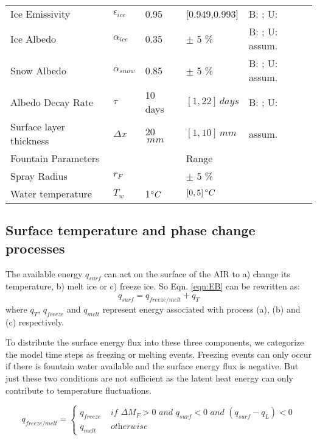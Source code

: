 \documentclass[utf8]{frontiersSCNS} %
\begin{document}
\begin{table}
\begin{tabularx}{\linewidth}{ X l X l X  }
        Ice Emissivity        & $\epsilon_{ice}$ & 0.95 & [0.949,0.993] & B: \citeauthor{CuffeyPaterson_2010}; U:
        \citeauthor{HORI2006486}\\
        Ice Albedo         & $\alpha_{ice}$ & 0.35 & $\pm$ 5 \%  & B: \citeauthor{CuffeyPaterson_2010}; U: assum.   \\
        
        Snow Albedo        & $\alpha_{snow}$ & 0.85 & $\pm$ 5 \% & B: \citeauthor{CuffeyPaterson_2010}; U: assum.  \\
        Albedo Decay Rate & $\tau$ & 10 days & $[1,22]\, days$ & B: \citeauthor{Schmidt_2017}; U:
        \citeauthor{OerlemansKnap_1998}  \\ Surface layer thickness & $\Delta x$ & 20 $\,mm$ & $[1,10]\, mm$   & assum.\\
        \hline Fountain Parameters& & & Range   & \\ \hline 
        Spray Radius & $r_F$ &  & $\pm$ 5 \%   & \\
        Water temperature & $T_w$ & 1$\degree C$ & $[0,5]\, \degree C$   & \\
        \hline \end{tabularx} \label{table:parameters} \end{table} 

\subsection{Surface temperature and phase change processes} 
The available energy $q_{surf}$ can act on the surface of the AIR to a) change its temperature, b) melt ice or
c) freeze ice. So Eqn. \ref{eqn:EB} can be rewritten as: \begin{equation} q_{surf} = q_{freeze/melt} +
q_{T} \end{equation}
where $q_{T}$, $q_{freeze}$ and $q_{melt}$ represent energy associated with process (a), (b) and (c) respectively.

To distribute the surface energy flux into these three components, we categorize the model time steps as freezing or
melting events. Freezing events can only occur if there is fountain water available and the surface energy flux is
negative. But just these two conditions are not sufficient as the latent heat energy can only contribute to temperature
fluctuations.

\begin{equation} 
    q_{freeze/melt} = \left\{ \begin{array}{ll}
            q_{freeze} & \textit{ if } \Delta M_{F} > 0 \textit{ and } q_{surf} < 0 \textit{ and }(q_{surf}-q_{L}) < 0 \\
            q_{melt} & \textit{ otherwise} 
    \end{array} \right. 
\end{equation} 
\end{document}
